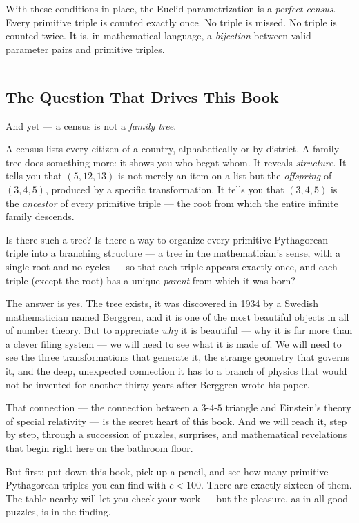 With these conditions in place, the Euclid parametrization is a \emph{perfect census}. Every primitive triple is counted exactly once. No triple is missed. No triple is counted twice. It is, in mathematical language, a \emph{bijection} between valid parameter pairs and primitive triples.

\bigskip\noindent\rule{\linewidth}{0.4pt}\bigskip

\subsection*{The Question That Drives This Book}
And yet --- a census is not a \emph{family tree}.

A census lists every citizen of a country, alphabetically or by district. A family tree does something more: it shows you who begat whom. It reveals \emph{structure}. It tells you that \((5, 12, 13)\) is not merely an item on a list but the \emph{offspring} of \((3, 4, 5)\), produced by a specific transformation. It tells you that \((3, 4, 5)\) is the \emph{ancestor} of every primitive triple --- the root from which the entire infinite family descends.

Is there such a tree? Is there a way to organize every primitive Pythagorean triple into a branching structure --- a tree in the mathematician's sense, with a single root and no cycles --- so that each triple appears exactly once, and each triple (except the root) has a unique \emph{parent} from which it was born?

The answer is yes. The tree exists, it was discovered in 1934 by a Swedish mathematician named Berggren, and it is one of the most beautiful objects in all of number theory. But to appreciate \emph{why} it is beautiful --- why it is far more than a clever filing system --- we will need to see what it is made of. We will need to see the three transformations that generate it, the strange geometry that governs it, and the deep, unexpected connection it has to a branch of physics that would not be invented for another thirty years after Berggren wrote his paper.

That connection --- the connection between a \(3\)-\(4\)-\(5\) triangle and Einstein's theory of special relativity --- is the secret heart of this book. And we will reach it, step by step, through a succession of puzzles, surprises, and mathematical revelations that begin right here on the bathroom floor.

But first: put down this book, pick up a pencil, and see how many primitive Pythagorean triples you can find with \(c < 100\). There are exactly sixteen of them. The table nearby will let you check your work --- but the pleasure, as in all good puzzles, is in the finding.


